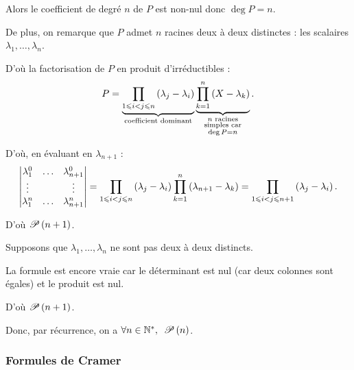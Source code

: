\begin{dem}
Alors le coefficient de degré \(n\) de \(P\) est non-nul donc \(\deg P=n\).

De plus, on remarque que \(P\) admet \(n\) racines deux à deux distinctes : les scalaires \(\lambda_1,\dots,\lambda_n\).

D'où la factorisation de \(P\) en produit d'irréductibles : \[P=\underbrace{\prod_{1\leq i<j\leq n}\paren{\lambda_j-\lambda_i}}_{\text{coefficient dominant}}\underbrace{\prod_{k=1}^n\paren{X-\lambda_k}}_{\substack{n\text{ racines} \\ \text{simples car} \\ \deg P=n}}.\]

D'où, en évaluant en \(\lambda_{n+1}\) : \[\begin{vmatrix}
\lambda_1^0 & \dots & \lambda_{n+1}^0 \\
\vdots &  & \vdots \\
\lambda_1^n & \dots & \lambda_{n+1}^n
\end{vmatrix}=\prod_{1\leq i<j\leq n}\paren{\lambda_j-\lambda_i}\prod_{k=1}^n\paren{\lambda_{n+1}-\lambda_k}=\prod_{1\leq i<j\leq n+1}\paren{\lambda_j-\lambda_i}.\]

D'où \(\P{n+1}\).

Supposons que \(\lambda_1,\dots,\lambda_n\) ne sont pas deux à deux distincts.

La formule est encore vraie car le déterminant est nul (car deux colonnes sont égales) et le produit est nul.

D'où \(\P{n+1}\).

Donc, par récurrence, on a \(\quantifs{\forall n\in\Ns}\P{n}\).
\end{dem}

\subsubsection{Formules de Cramer}

